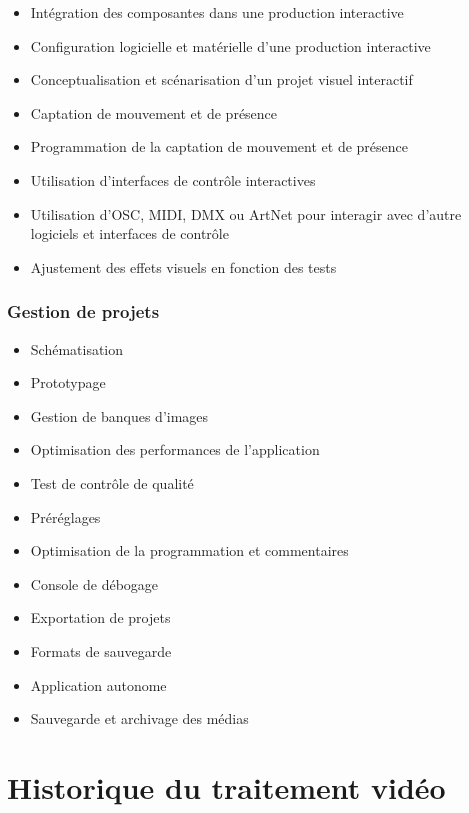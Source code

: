 \documentclass[
]{book}
\providecommand{\tightlist}{%
  \setlength{\itemsep}{0pt}\setlength{\parskip}{0pt}}
\begin{document}
\begin{itemize}
\tightlist
\item
  Intégration des composantes dans une production interactive
\item
  Configuration logicielle et matérielle d'une production interactive\\
\item
  Conceptualisation et scénarisation d'un projet visuel interactif\\
\item
  Captation de mouvement et de présence
\item
  Programmation de la captation de mouvement et de présence
\item
  Utilisation d'interfaces de contrôle interactives
\item
  Utilisation d'OSC, MIDI, DMX ou ArtNet pour interagir avec d'autre logiciels et interfaces de contrôle
\item
  Ajustement des effets visuels en fonction des tests
\end{itemize}

\hypertarget{gestion-de-projets}{%
\subsection{Gestion de projets}\label{gestion-de-projets}}

\begin{itemize}
\tightlist
\item
  Schématisation
\item
  Prototypage
\item
  Gestion de banques d'images
\item
  Optimisation des performances de l'application
\item
  Test de contrôle de qualité
\item
  Préréglages
\item
  Optimisation de la programmation et commentaires
\item
  Console de débogage
\item
  Exportation de projets
\item
  Formats de sauvegarde\\
\item
  Application autonome
\item
  Sauvegarde et archivage des médias
\end{itemize}

\hypertarget{historique}{%
\chapter{Historique du traitement vidéo}\label{historique}}
\end{document}
